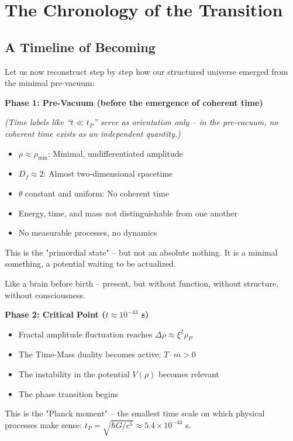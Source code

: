 	\section{The Chronology of the Transition}
	
	\subsection{A Timeline of Becoming}
	
	Let us now reconstruct step by step how our structured universe emerged from the minimal pre-vacuum:
	
	\textbf{Phase 1: Pre-Vacuum (before the emergence of coherent time)}
	
	\textit{(Time labels like ``$t \ll t_P$'' serve as orientation only -- in the pre-vacuum, no coherent time exists as an independent quantity.)}
	
	\begin{itemize}[leftmargin=*]
		\item $\rho \approx \rho_{\min}$: Minimal, undifferentiated amplitude
		\item $D_f \approx 2$: Almost two-dimensional spacetime
		\item $\theta$ constant and uniform: No coherent time
		\item Energy, time, and mass not distinguishable from one another
		\item No measurable processes, no dynamics
	\end{itemize}
	
	This is the "primordial state" -- but not an absolute nothing. It is a minimal something, a potential waiting to be actualized.
	
	Like a brain before birth -- present, but without function, without structure, without consciousness.
	
	\textbf{Phase 2: Critical Point ($t \approx 10^{-43}$ s)}
	
	\begin{itemize}[leftmargin=*]
		\item Fractal amplitude fluctuation reaches $\Delta\rho \approx \xi^2\rho_P$
		\item The Time-Mass duality becomes active: $T \cdot m > 0$
		\item The instability in the potential $V(\rho)$ becomes relevant
		\item The phase transition begins
	\end{itemize}
	
	This is the "Planck moment" -- the smallest time scale on which physical processes make sense: $t_P = \sqrt{\hbar G/c^5} \approx 5.4 \times 10^{-44}$ s.
	
